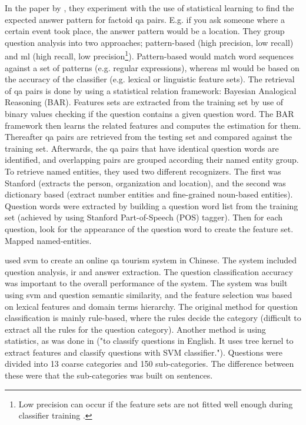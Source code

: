 In the paper by \textcite{Toba2011}, they experiment with the use of statistical learning to find the expected answer pattern for factoid \gls{qa} pairs. 
E.g. if you ask someone where a certain event took place, the answer pattern would be a location. 
They group question analysis into two approaches; pattern-based (high precision, low recall) and \gls{ml} (high recall, 
low precision\footnote{
	Low precision can occur if the feature sets are not fitted well enough during classifier training 
	\cite[p.~283]{Toba2011}.
	}). 
Pattern-based would match word sequences against a set of patterns (e.g. regular expressions), whereas \gls{ml} would be based on the accuracy of the classifier 
(e.g. lexical or linguistic feature sets). 
The retrieval of \gls{qa} pairs is done by using a statistical relation framework: Bayesian Analogical Reasoning (BAR). 
Features sets are extracted from the training set by use of binary values checking if the question contains a given question word. 
The BAR framework then learns the related features and computes the estimation for them. 
Thereafter \gls{qa} pairs are retrieved from the testing set and compared against the training set. 
Afterwards, the \gls{qa} pairs that have identical question words are identified, and overlapping pairs are grouped according their named entity group.
To retrieve named entities, they used two different recognizers. 
The first was Stanford (extracts the person, organization and location), and the second was dictionary based (extract number entities and fine-grained noun-based entities). 
Question words were extracted by building a question word list from the training set (achieved by using Stanford Part-of-Speech (POS) tagger). 
Then for each question, look for the appearance of the question word to create the feature set.
Mapped named-entities.
\cite{Toba2011}



\textcite{Xu2012} used \gls{svm} to create an online \gls{qa} tourism system in Chinese. 
The system included question analysis, \gls{ir} and answer extraction. 
The question classification accuracy was important to the overall performance of the system. 
The system was built using \gls{svm} and question semantic similarity, and the feature selection was based on lexical features and domain terms hierarchy. 
The original method for question classification is mainly rule-based, where the rules decide the category (difficult to extract all the rules for the question category). 
Another method is using statistics, as was done in \cite{Zhang2003} ("to classify questions in English. It uses tree kernel to extract features and classify questions with SVM classifier."). 
Questions were divided into 13 coarse categories and 150 sub-categories. 
The difference between these were that the sub-categories was built on sentences.
\textcite{Xu2012}


